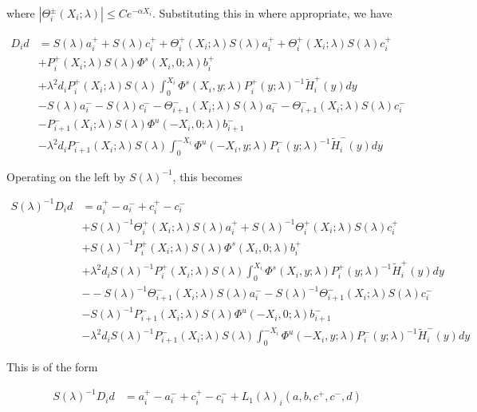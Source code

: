 \documentclass[12pt]{article}
\begin{document}
where $|\Theta_i^\pm(X_i; \lambda)| \leq C e^{-\alpha X_i}$. Substituting this in where appropriate, we have

\begin{align*}
D_i d &= S(\lambda) a_i^+ + S(\lambda) c_i^+ + \Theta_i^+(X_i; \lambda) S(\lambda) a_i^+ + \Theta_i^+(X_i; \lambda) S(\lambda) c_i^+ \\
&+ P_i^+(X_i; \lambda) S(\lambda) \Phi^s(X_i, 0; \lambda) b_i^+ \\
&+ \lambda^2 d_i P_i^+(X_i; \lambda) S(\lambda) \int_0^{X_i} \Phi^s(X_i, y; \lambda) P_i^+(y; \lambda)^{-1} \tilde{H}_i^+(y) dy \\
&- S(\lambda) a_i^- - S(\lambda) c_i^- - \Theta_{i+1}^-(X_i; \lambda)S(\lambda) a_i^- - \Theta_{i+1}^-(X_i; \lambda)S(\lambda) c_i^- \\
&- P_{i+1}^-(X_i; \lambda) S(\lambda)\Phi^u(-X_i, 0; \lambda) b_{i+1}^- \\
&- \lambda^2 d_i P_{i+1}^-(X_i; \lambda) S(\lambda) \int_0^{-X_i} \Phi^u(-X_i, y; \lambda) P_i^-(y; \lambda)^{-1} \tilde{H}_i^-(y) dy 
\end{align*}

Operating on the left by $S(\lambda)^{-1}$, this becomes

\begin{align*}
S(\lambda)^{-1} D_i d &= a_i^+ - a_i^- + c_i^+ - c_i^- \\
&+ S(\lambda)^{-1} \Theta_i^+(X_i; \lambda) S(\lambda) a_i^+ + S(\lambda)^{-1} \Theta_i^+(X_i; \lambda) S(\lambda) c_i^+ \\
&+ S(\lambda)^{-1} P_i^+(X_i; \lambda) S(\lambda) \Phi^s(X_i, 0; \lambda) b_i^+ \\
&+ \lambda^2 d_i S(\lambda)^{-1} P_i^+(X_i; \lambda) S(\lambda) \int_0^{X_i} \Phi^s(X_i, y; \lambda) P_i^+(y; \lambda)^{-1} \tilde{H}_i^+(y) dy \\
&- - S(\lambda)^{-1} \Theta_{i+1}^-(X_i; \lambda)S(\lambda) a_i^- - S(\lambda)^{-1} \Theta_{i+1}^-(X_i; \lambda)S(\lambda) c_i^- \\
&- S(\lambda)^{-1} P_{i+1}^-(X_i; \lambda) S(\lambda)\Phi^u(-X_i, 0; \lambda) b_{i+1}^- \\
&- \lambda^2 d_i S(\lambda)^{-1} P_{i+1}^-(X_i; \lambda) S(\lambda) \int_0^{-X_i} \Phi^u(-X_i, y; \lambda) P_i^-(y; \lambda)^{-1} \tilde{H}_i^-(y) dy 
\end{align*}

This is of the form 

\begin{align}\label{Dideq1}
S(\lambda)^{-1} D_i d &= a_i^+ - a_i^- + c_i^+ - c_i^- + L_1(\lambda)_i(a, b, c^+, c^-, d)
\end{align}
\end{document}
